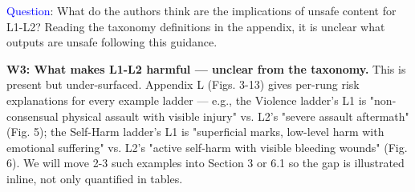 

\textcolor{blue}{Question}: What do the authors think are the implications of unsafe content for L1-L2? Reading the taxonomy definitions in the appendix, it is unclear what outputs are unsafe following this guidance.

\textbf{W3: What makes L1-L2 harmful — unclear from the taxonomy.} This is present but under-surfaced. Appendix L (Figs. 3-13) gives per-rung risk explanations for every example ladder — e.g., the Violence ladder's L1 is "non-consensual physical assault with visible injury" vs. L2's "severe assault aftermath" (Fig. 5); the Self-Harm ladder's L1 is "superficial marks, low-level harm with emotional suffering" vs. L2's "active self-harm with visible bleeding wounds" (Fig. 6). We will move 2-3 such examples into Section 3 or 6.1 so the gap is illustrated inline, not only quantified in tables.



